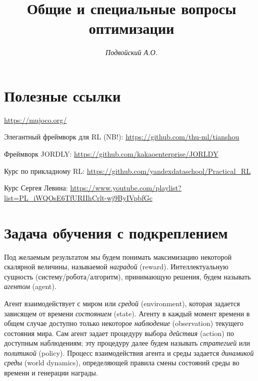 \documentclass[%
	11pt,
	a4paper,
	utf8,
		]{article}
\begin{document}
\title{Общие и специальные вопросы оптимизации}

\author{\itshape Подвойский А.О.}

\date{}
\maketitle

\thispagestyle{fancy}




\tableofcontents

\section{Полезные ссылки}

\url{https://mujoco.org/}

Элегантный фреймворк для RL (NB!): \url{https://github.com/thu-ml/tianshou}

Фреймворк JORDLY: \url{https://github.com/kakaoenterprise/JORLDY}

Курс по прикладному RL: \url{https://github.com/yandexdataschool/Practical_RL}

Курс Сергея Левина: \url{https://www.youtube.com/playlist?list=PL_iWQOsE6TfURIIhCrlt-wj9ByIVpbfGc}

\section{Задача обучения с подкреплением}

Под желаемым результатом мы будем понимать максимизацию некоторой скалярной величины, называемой \emph{наградой} (reward). Интеллектуальную сущность (систему/робота/алгоритм), принимающую решения, будем называть \emph{агентом} (agent).

Агент взаимодействует с миром или \emph{средой} (environment), которая задается зависящем от времени \emph{состоянием} (state). Агенту в каждый момент времени в общем случае доступно только некоторое \emph{наблюдение} (observation) текущего состояния мира. Сам агент задает процедуру выбора \emph{действия} (action) по доступным наблюдениям; эту процедуру далее будем называть \emph{стратегией} или \emph{политикой} (policy). Процесс взаимодействия агента и среды задается \emph{динамикой среды} (world dynamics), определяющей правила смены состояний среды во времени и генерации награды.
\end{document}
